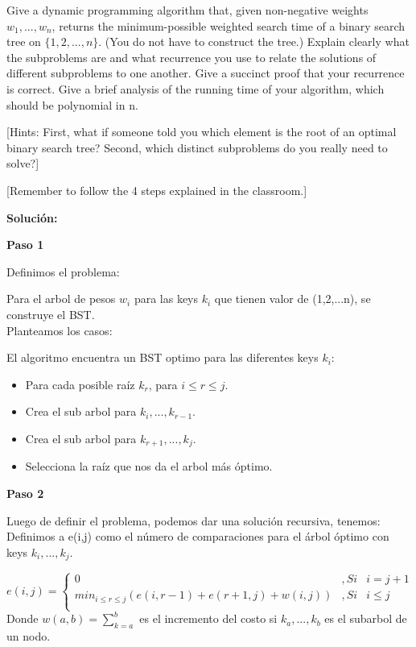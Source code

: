 \documentclass{article}
\begin{document}
Give a dynamic programming algorithm that, given non-negative weights $w_1, ..., w_n$, returns the minimum-possible weighted search time of a binary search tree on $\{1, 2, ..., n\}$. (You do not have to construct the tree.) Explain clearly what the subproblems are and what recurrence you use to relate the solutions of
different subproblems to one another. Give a succinct proof that your recurrence is correct. Give a brief analysis of the running time of your algorithm, which should be polynomial in n. 

[Hints: First, what if someone told you which element is the root of an optimal binary search tree? Second, which distinct subproblems do you really need to solve?]


[Remember to follow the 4 steps explained in the classroom.]

\textbf{Solución:}

\textbf{Paso 1}

Definimos el problema:

Para el arbol de pesos $w_i$ para las keys $k_i$ que tienen valor de (1,2,...n), se construye el BST.\\
Planteamos los casos:

El algoritmo encuentra un BST optimo para las diferentes keys $k_i$:

\begin{itemize}
\item Para cada posible raíz $k_r$, para $i \leq r \leq j$.
\item Crea el sub arbol para $k_i, ..., k_{r-1}$.
\item Crea el sub arbol para $k_{r+1}, ..., k_{j}$.
\item Selecciona la raíz que nos da el arbol más óptimo.
\end{itemize}

\textbf{Paso 2}

Luego de definir el problema, podemos dar una solución recursiva, tenemos:\\
Definimos a e(i,j) como el número de comparaciones para el árbol óptimo con keys $k_i, ..., k_j$.

\begin{center}
$$
e(i,j) =
   \left \{
      \begin{array}{lcl}
          0             &, Si & i=j+1\\
 min_{i \leq r \leq j} (e(i,r-1)+e(r+1,j)+w(i,j))&, Si & i \leq j\\
      \end{array}
   \right .
$$
Donde $w(a,b) = \sum_{k=a}^{b} $ es el incremento del costo si $k_a, ..., k_b$ es el subarbol de un nodo.
\end{center}
\end{document}
